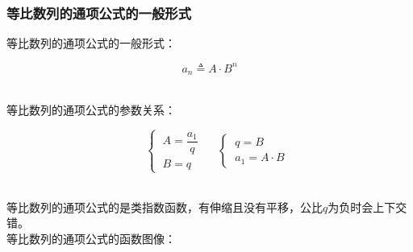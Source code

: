 \documentclass[UTF8]{ctexart}
\begin{document}
\newpage

\subsubsection{等比数列的通项公式的一般形式}
    \setcounter{equation}{0}
    等比数列的通项公式的一般形式：
    \begin{large}
        \begin{equation*}
            a_n\triangleq A\cdot B^n
        \end{equation*}
    \end{large}\\
    等比数列的通项公式的参数关系：
    \begin{large}
        \begin{equation*}
            ~~~~~~
            \begin{cases}
                ~A=\dfrac{a_1}{q}\\[3mm]
                ~B=q
            \end{cases}~~~~~~
            \begin{cases}
                ~q=B\\[3mm]
                ~a_1=A\cdot B
            \end{cases}
        \end{equation*}
    \end{large}\\
    等比数列的通项公式的是类指数函数，有伸缩且没有平移，公比$q$为负时会上下交错。\\[3mm]
    等比数列的通项公式的函数图像：
\end{document}
